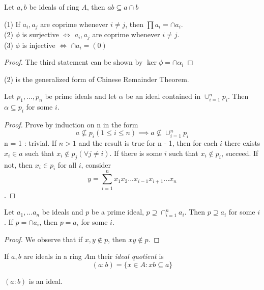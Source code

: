 \documentclass[11pt,fleqn]{book} %
\begin{document}
\begin{CJK}{UTF8}{gkai}
\begin{definition}
\end{definition}
\begin{remark}
	Let $a, b$ be ideals of ring $A$, then $ab \subseteq a \cap b$
\end{remark}

\begin{proposition}
	(1) If $a_i, a_j$ are coprime whenever $i\neq j$, then $\prod a_i = \cap a_i$. \\
	(2) $\phi$ is surjective $\iff$ $a_i, a_j$ are coprime whenever $i\neq j$. \\
	(3) $\phi$ is injective $\iff$ $\cap a_i = (0)$
\end{proposition}
\begin{proof}
	The third statement can be shown by $\ker \phi = \cap \alpha_i$
\end{proof}
\begin{remark}
	(2) is the generalized form of Chinese Remainder Theorem.	
\end{remark}

\begin{proposition}
	Let $p_1, ... , p_n$ be prime ideals and let $\alpha$ be an ideal contained in $\cup_{i=1}^n p_i$. Then $\alpha \subseteq p_i$ for some $i$. 
\end{proposition}
\begin{proof}
	Prove by induction on n in the form 
	\[a \nsubseteq p_i (1\leq i \leq n) \implies a\nsubseteq \cup_{i=1}^n p_i\]
	n = 1 : trivial. If $n>1$ and the result is true for n - 1, then for each $i$ there exists $x_i \in a$ such that $x_i \notin p_j(\forall j\neq i)$. If there is some $i$ such that $x_i \notin p_i$, succeed. If not, then $x_i \in p_i$ for all $i$,
	consider
	\[y = \sum_{i=1}^{n}x_1x_2...x_{i-1}x_{i+1}...x_n\].
\end{proof}


\begin{proposition}
	Let $a_1,...a_n$ be ideals and $p$ be a prime ideal, $p \supseteq \cap_{i=1}^n a_i$. Then $p \supseteq a_i$ for some $i$. If $p = \cap a_i$, then $p = a_i$ for some $i$.
\end{proposition}
\begin{proof}
	We observe that if $x,y \notin p$, then $xy \notin p$.
\end{proof}

\begin{definition}
	If $a, b$ are ideals in a ring $A$m their {\it ideal quotient} is 
	\[(a : b) = \{x\in A : xb\subseteq a\}\]
\end{definition}
\begin{remark}
	$(a :b)$ is an ideal.
\end{remark}


\end{CJK}
\end{document}
